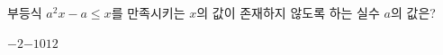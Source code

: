 부등식 $a^2x-a\le x$를 만족시키는 $x$의 값이 존재하지 않도록 하는 실수 $a$의 값은?
\begin{choices32}{$-2$}{$-1$}{$0$}{$1$}{$2$}\end{choices32}

